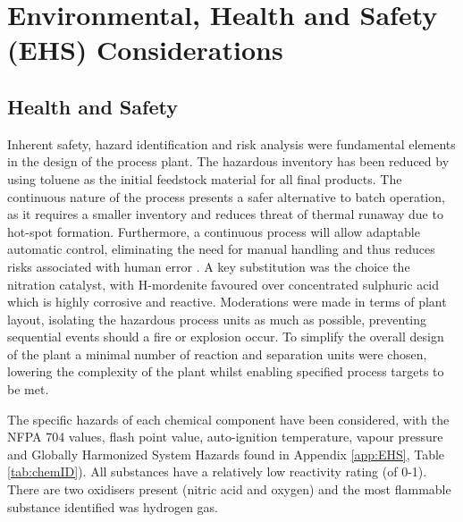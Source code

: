\section{Environmental, Health and Safety (EHS) Considerations}
\label{sec:ehs}


\subsection{Health and Safety}

Inherent safety, hazard identification and risk analysis were fundamental elements in the design of the process plant. The hazardous inventory has been reduced by using toluene as the initial feedstock material for all final products. The continuous nature of the process presents a safer alternative to batch operation, as it requires a smaller inventory and reduces threat of thermal runaway due to hot-spot formation. Furthermore, a continuous process will allow adaptable automatic control, eliminating the need for manual handling and thus reduces risks associated with human error \cite{mannan_lees_2012}. A key substitution was the choice the nitration catalyst, with H-mordenite favoured over concentrated sulphuric acid which is highly corrosive and reactive. Moderations were made in terms of plant layout, isolating the hazardous process units as much as possible, preventing sequential events should a fire or explosion occur. To simplify the overall design of the plant a minimal number of reaction and separation units were chosen, lowering the complexity of the plant whilst enabling specified process targets to be met. 

The specific hazards of each chemical component have been considered, with the NFPA 704 values, flash point value, auto-ignition temperature, vapour pressure and Globally Harmonized System Hazards found in Appendix \ref{app:EHS}, Table \ref{tab:chemID}). All substances have a relatively low reactivity rating (of 0-1). There are two oxidisers present (nitric acid and oxygen) and the most flammable substance identified was hydrogen gas.  

